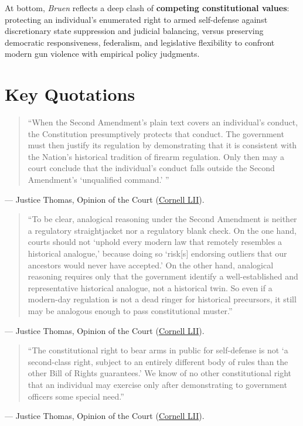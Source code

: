 \documentclass[12pt]{article}
\begin{document}
At bottom, \textit{Bruen} reflects a deep clash of \textbf{competing constitutional values}: protecting an individual's enumerated right to armed self-defense against discretionary state suppression and judicial balancing, versus preserving democratic responsiveness, federalism, and legislative flexibility to confront modern gun violence with empirical policy judgments.

\section{Key Quotations}

\begin{quote}
``When the Second Amendment's plain text covers an individual's conduct, the Constitution presumptively protects that conduct. The government must then justify its regulation by demonstrating that it is consistent with the Nation's historical tradition of firearm regulation. Only then may a court conclude that the individual's conduct falls outside the Second Amendment's `unqualified command.' ''
\end{quote}
\noindent --- Justice Thomas, Opinion of the Court (\href{https://www.law.cornell.edu/supremecourt/text/20-843}{Cornell LII}).

\begin{quote}
``To be clear, analogical reasoning under the Second Amendment is neither a regulatory straightjacket nor a regulatory blank check. On the one hand, courts should not `uphold every modern law that remotely resembles a historical analogue,' because doing so `risk[s] endorsing outliers that our ancestors would never have accepted.' On the other hand, analogical reasoning requires only that the government identify a well-established and representative historical analogue, not a historical twin. So even if a modern-day regulation is not a dead ringer for historical precursors, it still may be analogous enough to pass constitutional muster.''
\end{quote}
\noindent --- Justice Thomas, Opinion of the Court (\href{https://www.law.cornell.edu/supremecourt/text/20-843}{Cornell LII}).

\begin{quote}
``The constitutional right to bear arms in public for self-defense is not `a second-class right, subject to an entirely different body of rules than the other Bill of Rights guarantees.' We know of no other constitutional right that an individual may exercise only after demonstrating to government officers some special need.''
\end{quote}
\noindent --- Justice Thomas, Opinion of the Court (\href{https://www.law.cornell.edu/supremecourt/text/20-843}{Cornell LII}).
\end{document}
